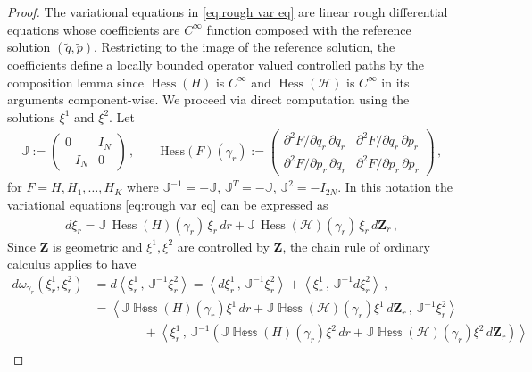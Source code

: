 \documentclass[11pt, oneside]{article}
\numberwithin{equation}{section}
\theoremstyle{definition}
\newcommand{\wt}[1]{\widetilde{#1}}
\newcommand{\mc}[1]{\mathcal{#1}}
\newcommand{\mcal}[1]{\mc{#1}}
\newcommand{\scp}[2]{{\left\langle {#1}\, , \, {#2}\right\rangle}}
\def\p{{\partial}}
\def\p{\partial}
\begin{document}
\begin{proof}
    The variational equations in \eqref{eq:rough var eq} are linear rough differential equations whose coefficients are $C^\infty$ function composed with the reference solution $(\wt{q}, \wt{p})$. Restricting to the image of the reference solution, the coefficients define a locally bounded operator valued controlled paths by the composition lemma \cite[Lem. 7.3]{FH2020} since $\operatorname{Hess}(H)$ is $C^\infty$ and $\operatorname{Hess}(\mcal{H})$ is $C^\infty$ in its arguments component-wise. We proceed via direct computation using the solutions $\xi^1$ and $\xi^2$. Let
    \begin{align*}
        \mathbb{J} := \begin{pmatrix} 0 & I_N \\ -I_N & 0\end{pmatrix}\,,
        \qquad
        \mathrm{Hess}(F)(\gamma_r) := \begin{pmatrix}
            \p^2 F/\p q_r\,\p q_r & \p^2 F/\p q_r\,\p p_r \\
            \p^2 F/\p p_r\,\p q_r & \p^2 F/\p p_r\,\p p_r
        \end{pmatrix}\,,
    \end{align*}
    for $F = H, H_1, \ldots, H_K$ where $\mathbb{J}^{-1} = -\mathbb{J}$, $\mathbb{J}^T = -\mathbb{J}$, $\mathbb{J}^2 = -I_{2N}$. In this notation the variational equations \eqref{eq:rough var eq} can be expressed as
    \begin{align*}
        d\xi_r = \mathbb{J}\,\operatorname{Hess}(H)(\gamma_r)\,\xi_r\,dr + \mathbb{J}\,\operatorname{Hess}(\mcal{H})(\gamma_r)\,\xi_r\,d\mathbf{Z}_r\,,
    \end{align*}
    Since $\mathbf{Z}$ is geometric and $\xi^1, \xi^2$ are controlled by $\mathbf{Z}$, the chain rule of ordinary calculus applies to have
    \begin{align*}
        d\omega_{\gamma_r}(\xi^1_r, \xi^2_r) &= d \scp{\xi^1_r}{\mathbb{J}^{-1}\xi^2_r} = \scp{d\xi^1_r}{\mathbb{J}^{-1}\xi^2_r} + \scp{\xi^1_r}{\mathbb{J}^{-1}d\xi^2_r}\,,\\
        &=\scp{\mathbb{J\operatorname{Hess}}(H)(\gamma_r)\xi^1\,dr + \mathbb{J\operatorname{Hess}}(\mcal{H})(\gamma_r)\xi^1\,d\mathbf{Z}_r }{\mathbb{J}^{-1}\xi^2_r} \\
        & \qquad \qquad  + \scp{\xi^1_r }{\mathbb{J}^{-1}\left(\mathbb{J\operatorname{Hess}}(H)(\gamma_r)\xi^2\,dr + \mathbb{J\operatorname{Hess}}(\mcal{H})(\gamma_r)\xi^2\,d\mathbf{Z}_r\right)}\\

\end{align*}
\end{proof}
\end{document}
